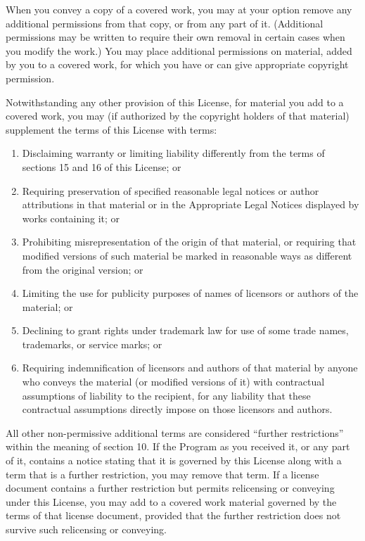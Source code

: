 \documentclass[11pt,twoside,fleqn,openright,titlepage]{cslreport}
\begin{document}
\begin{small}
\begin{enumerate}
When you convey a copy of a covered work, you may at your option
remove any additional permissions from that copy, or from any part of
it.  (Additional permissions may be written to require their own
removal in certain cases when you modify the work.)  You may place
additional permissions on material, added by you to a covered work,
for which you have or can give appropriate copyright permission.

Notwithstanding any other provision of this License, for material you
add to a covered work, you may (if authorized by the copyright holders of
that material) supplement the terms of this License with terms:
  \begin{enumerate}
  \item Disclaiming warranty or limiting liability differently from the
  terms of sections 15 and 16 of this License; or

  \item Requiring preservation of specified reasonable legal notices or
  author attributions in that material or in the Appropriate Legal
  Notices displayed by works containing it; or

  \item Prohibiting misrepresentation of the origin of that material, or
  requiring that modified versions of such material be marked in
  reasonable ways as different from the original version; or

  \item Limiting the use for publicity purposes of names of licensors or
  authors of the material; or

  \item Declining to grant rights under trademark law for use of some
  trade names, trademarks, or service marks; or

  \item Requiring indemnification of licensors and authors of that
  material by anyone who conveys the material (or modified versions of
  it) with contractual assumptions of liability to the recipient, for
  any liability that these contractual assumptions directly impose on
  those licensors and authors.
  \end{enumerate}

All other non-permissive additional terms are considered ``further
restrictions'' within the meaning of section 10.  If the Program as you
received it, or any part of it, contains a notice stating that it is
governed by this License along with a term that is a further
restriction, you may remove that term.  If a license document contains
a further restriction but permits relicensing or conveying under this
License, you may add to a covered work material governed by the terms
of that license document, provided that the further restriction does
not survive such relicensing or conveying.


\end{enumerate}
\end{small}
\end{document}
